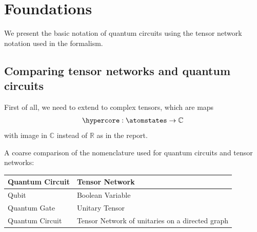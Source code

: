 \section{Foundations}

We present the basic notation of quantum circuits using the tensor network notation used in the \tnreason{} formalism.

\subsection{Comparing tensor networks and quantum circuits}

First of all, we need to extend to complex tensors, which are maps
\begin{align*}
    \hypercore : \atomstates \rightarrow \mathbb{C} \,
\end{align*}
with image in $\mathbb{C}$ instead of $\mathbb{R}$ as in the report.

A coarse comparison of the nomenclature used for quantum circuits and tensor networks:

\begin{center}
    \begin{tabular}{l|l}
        \textbf{Quantum Circuit} & \textbf{Tensor Network}                         \\
        \hline
        Qubit                    & Boolean Variable                                \\
        Quantum Gate             & Unitary Tensor                                  \\
        Quantum Circuit          & Tensor Network of unitaries on a directed graph
    \end{tabular}
\end{center}


